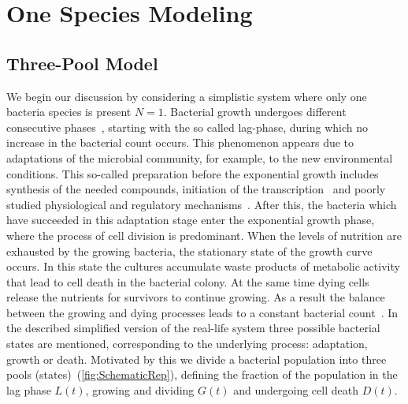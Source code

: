 \documentclass[10pt,A4paper]{article}
\numberwithin{equation}{section}
\begin{document}
\section{One Species Modeling}
\subsection{Three-Pool Model}
We begin our discussion by considering a simplistic system where only one bacteria species is present $N=1$.
Bacterial growth undergoes different consecutive phases~\cite{buchanan_when_1997}, starting with the so called lag-phase, during which no increase in the bacterial count occurs.
This phenomenon appears due to adaptations of the microbial community, for example, to the new environmental conditions.
This so-called preparation before the exponential growth includes synthesis of the needed compounds, initiation of the transcription~\cite{rolfe_lag_2012} and poorly studied physiological and regulatory mechanisms~\cite{monod_growth_1949}.
After this, the bacteria which have succeeded in this adaptation stage enter the exponential growth phase, where the process of cell division is predominant.
When the levels of nutrition are exhausted by the growing bacteria, the stationary state of the growth curve occurs.
In this state the cultures accumulate waste products of metabolic activity that lead to cell death in the bacterial colony.
At the same time dying cells release the nutrients for survivors to continue growing.
As a result the balance between the growing and dying processes leads to a constant bacterial count~\cite{navarro_llorens_stationary_2010}.
In the described simplified version of the real-life system three possible bacterial states are mentioned, corresponding to the underlying process: adaptation, growth or death.
Motivated by this we divide a bacterial population into three pools (states)~(\ref{fig:SchematicRep}), defining the fraction of the population in the lag phase $L(t)$, growing and dividing $G(t)$ and undergoing cell death $D(t)$.
\end{document}
